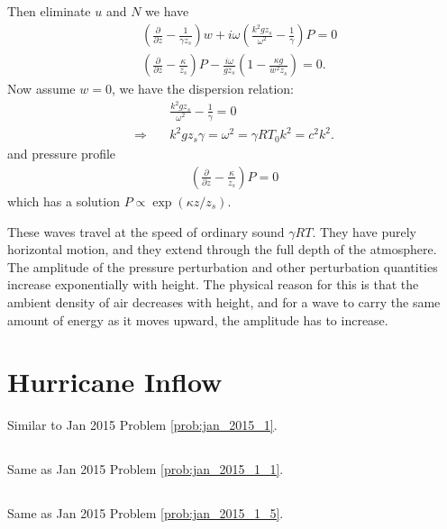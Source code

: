 \documentclass[11pt,letterpaper]{book}
\theoremstyle{definition}
\newcommand{\pe}{\partial}
\newcommand{\thus}{\Rightarrow \quad }
\begin{document}
\subsection{}
Then eliminate $u$ and $N$ we have
\begin{align*}
&\left(\frac{\pe}{\pe z}-\frac{1}{\gamma z_s}\right)w+i\omega\left(\frac{k^2 gz_s}{\omega^2}-\frac{1}{\gamma}\right)P = 0\\
&\left(\frac{\pe}{\pe z}-\frac{\kappa}{z_s}\right)P-\frac{i\omega}{gz_s}\left(1-\frac{\kappa g}{w^2 z_s}\right) = 0.
\end{align*}
Now assume $w=0$, we have the dispersion relation:
\begin{align*}
&\frac{k^2 gz_s}{\omega^2}-\frac{1}{\gamma} = 0\\
\thus & k^2 gz_s\gamma = {\omega^2} = \gamma RT_0k^2 = c^2k^2.
\end{align*}
and pressure profile
\begin{align*}
\left(\frac{\pe}{\pe z}-\frac{\kappa}{z_s}\right)P = 0
\end{align*}
which has a solution $P\propto \exp(\kappa z/z_s)$.

These waves travel at the speed of ordinary sound $\gamma RT$. They have purely horizontal motion, and they extend through the full depth of the atmosphere. The amplitude of the pressure perturbation and other perturbation quantities increase exponentially with height. The physical reason for this is that the ambient density of air decreases with height, and for a wave to carry the same amount of energy as it moves upward, the amplitude has to increase. 

\section{Hurricane Inflow}
Similar to Jan 2015 Problem \ref{prob:jan_2015_1}.

\subsection{}
Same as Jan 2015 Problem \ref{prob:jan_2015_1_1}.

\subsection{}
Same as Jan 2015 Problem \ref{prob:jan_2015_1_5}.
\end{document}
